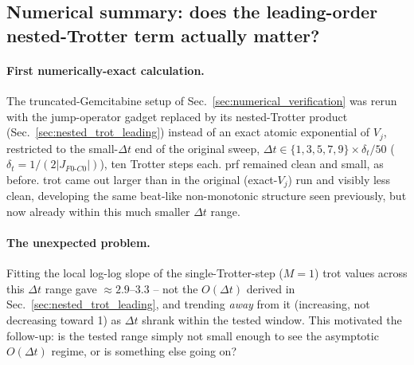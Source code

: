 \documentclass[11pt]{article}
\newcommand{\Dt}{\Delta t}
\begin{document}
\subsection{Numerical summary: does the leading-order nested-Trotter term actually matter?}
\label{sec:nested_trot_numerics}

\paragraph{First numerically-exact calculation.} The truncated-Gemcitabine setup of Sec.~\ref{sec:numerical_verification} was rerun with the jump-operator gadget replaced by its nested-Trotter product (Sec.~\ref{sec:nested_trot_leading}) instead of an exact atomic exponential of $V_j$, restricted to the small-$\Dt$ end of the original sweep, $\Dt\in\{1,3,5,7,9\}\times\delta_t/50$ ($\delta_t=1/(2|J_{F0\text{-}C0}|)$), ten Trotter steps each. prf remained clean and small, as before. trot came out larger than in the original (exact-$V_j$) run and visibly less clean, developing the same beat-like non-monotonic structure seen previously, but now already within this much smaller $\Dt$ range.

\paragraph{The unexpected problem.} Fitting the local log-log slope of the single-Trotter-step ($M=1$) trot values across this $\Dt$ range gave $\approx2.9$--$3.3$ -- not the $O(\Dt)$ derived in Sec.~\ref{sec:nested_trot_leading}, and trending \emph{away} from it (increasing, not decreasing toward 1) as $\Dt$ shrank within the tested window. This motivated the follow-up: is the tested range simply not small enough to see the asymptotic $O(\Dt)$ regime, or is something else going on?
\end{document}
